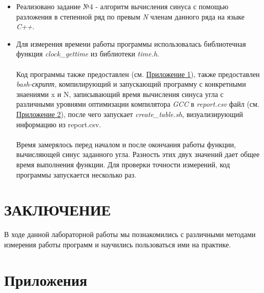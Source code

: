 \documentclass[12pt,a4paper]{article}
\numberwithin{subsection}{section}
\begin{document}
\begin{itemize}
    \item Реализовано задание №4 - алгоритм вычисления синуса с помощью разложения 
    в степенной ряд по превым \textit{N} членам данного ряда на языке \textit{C++}.
    \item Для измерения времени работы программы использовалась библиотечная 
    функция \textit{clock\_gettime}
    из библиотеки \textit{time.h}.
    \\
    \\
    Код программы также предоставлен (см. \hyperref[app:listing]{Приложение 1}), 
    также предоставлен \textit{bash-скрипт}, компилирующий и запускающий программу 
    с конкретными знаениями x и N, записывающий время вычисления синуса угла с 
    различными уровнями оптимизации компилятора \textit{GCC} в \textit{report.csv} 
    файл (см. \hyperref[app:listing]{Приложение 2}), после чего запускает
    \textit{create\_table.sh}, визуализирующий информацию из report.csv.
    \\
    \\
    Время замерялось перед началом и после окончания работы функции, вычисляющей
    синус заданного угла. Разность этих двух значений дает общее время выполнения функции. 
    Для проверки точности измерений, код программы запускается несколько раз.
\end{itemize}


\section{ЗАКЛЮЧЕНИЕ}
В ходе данной лабораторной работы мы познакомились с различными методами измерения 
работы программ и научились пользоваться ими на практике.

\newpage


\section*{Приложения}\label{app:listing}
\end{document}
